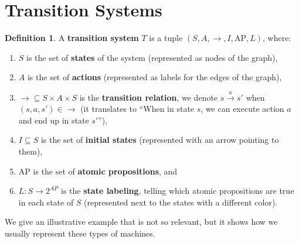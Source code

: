 \documentclass{tufte-handout} %
\theoremstyle{definition}
\newtheorem{defn}[thm]{Definition}
\theoremstyle{remark}
\newtheorem{rem}[thm]{Remark}
\newcommand{\0}{\textsf{0}}
\newcommand{\1}{\textsf{1}}
\newcommand{\AP}{\text{AP}}
\newcommand{\action}[1]{\stackrel{#1}{\rightarrow}}
\begin{document}
\section{Transition Systems}
\begin{defn}
	A \textbf{transition system} $T$ is a tuple $(S, A, \rightarrow, I, \AP, L)$, where:
	\begin{enumerate}
		\item $S$ is the set of \textbf{states} of the system (represented as nodes of the graph),
		\item $A$ is the set of \textbf{actions} (represented as labels for the edges of the graph),
		\item $\rightarrow \subseteq S\times A \times S$ is the \textbf{transition relation}, we denote $s \action{a} s'$ when $(s,a,s') \in \rightarrow$ (it translates to \textquotedblleft When in state $s$, we can execute action $a$ and end up in state $s'$\textquotedblright),
		\item $I\subseteq S$ is the set of \textbf{initial states} (represented with an arrow pointing to them),
		\item $\AP$ is the set of \textbf{atomic propositions}, and
		\item $L: S\rightarrow 2^{AP}$ is the \textbf{state labeling}, telling which atomic propositions are true in each state of $S$ (represented next to the states with a different color). 
	\end{enumerate}
\end{defn}
We give an illustrative example that is not so relevant, but it shows how we usually represent these types of machines.
\end{document}
